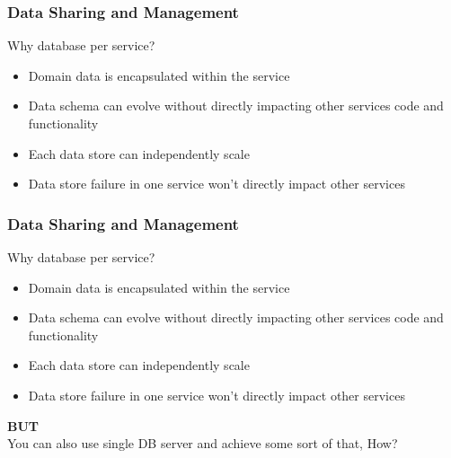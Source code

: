 \documentclass{beamer}
\begin{document}
		\begin{frame}
			\frametitle{Data Sharing and Management}
				Why database per service?
					\begin{itemize}
						\item<1-> \scriptsize{Domain data is encapsulated within the service }
						\item<2-> \scriptsize{Data schema can evolve without directly impacting other services code and functionality}
						\item<3-> \scriptsize{Each data store can independently scale}
						\item<4-> \scriptsize{Data store failure in one service won't directly impact other services}
					\end{itemize}
				\vspace{100mm}
		\end{frame}
	
		\begin{frame}
			\frametitle{Data Sharing and Management}
				Why database per service?
				\begin{itemize}
					\item \scriptsize{Domain data is encapsulated within the service }
					\item \scriptsize{Data schema can evolve without directly impacting other services code and functionality}
					\item \scriptsize{Each data store can independently scale}
					\item \scriptsize{Data store failure in one service won't directly impact other services}
				\end{itemize}
				
				\vspace{5mm}
				\textbf{BUT}\\
				\hspace{3mm} \scriptsize{You can also use single DB server and achieve some sort of that, How?} 
				\vspace{100mm}
			\end{frame}
		
\end{document}
